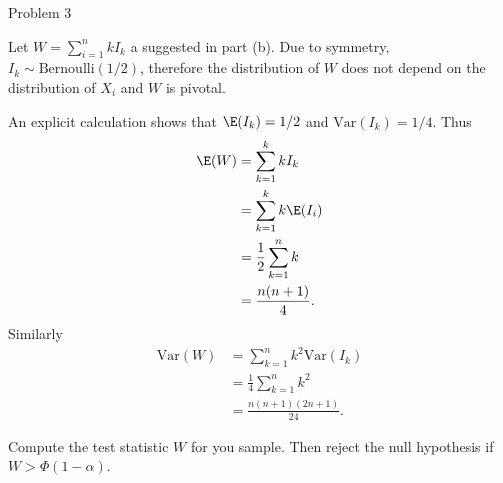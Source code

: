 \documentclass{article}
\begin{document}
\begin{question}{Problem 3}
    \begin{part}
        Let $W=\sum_{i=1}^nkI_k$ a suggested in part (b). Due to symmetry, $I_k\sim\mathrm{Bernoulli}(1/2)$, therefore the distribution of $W$ does not depend on the distribution of $X_i$ and $W$ is pivotal. 
    \end{part}
    \begin{part}
        An explicit calculation shows that $\E(I_k)=1/2$ and $\mathrm{Var}(I_k)=1/4$. Thus
        \begin{align*}
            \E(W) &= \sum_{k=1}^kkI_k\\
                  &= \sum_{k=1}^k k\E(I_i)\\
                  &=\frac{1}{2}\sum_{k=1}^nk\\
                  &= \frac{n(n+1)}{4}. 
        \end{align*}
        Similarly
        \begin{align*}
            \mathrm{Var}(W) &= \sum_{k=1}^nk^2\mathrm{Var}(I_k)\\
                            &= \frac{1}{4}\sum_{k=1}^nk^2\\
                            &= \frac{n(n+1)(2n+1)}{24}. 
        \end{align*}
    \end{part}
    \begin{part}
        Compute the test statistic $W$ for you sample. Then reject the null hypothesis if $W > \Phi(1-\alpha)$. 
    \end{part}
\end{question}

\end{document}
